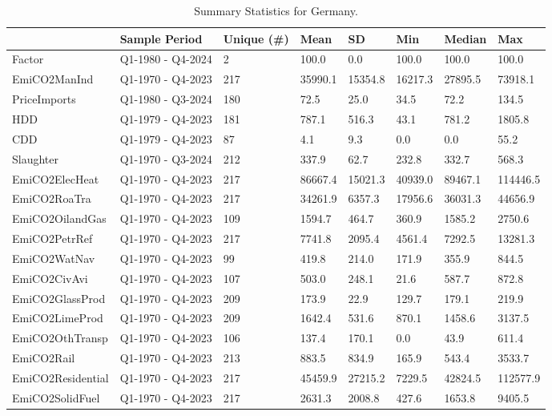 \begingroup\fontsize{7}{9}\selectfont

\begin{longtable}[t]{llllllll}
\caption{Summary Statistics for Germany.}\\
\toprule
  & Sample Period & Unique (\#) & Mean & SD & Min & Median & Max\\
\midrule
Factor & Q1-1980 - Q4-2024 & 2 & 100.0 & 0.0 & 100.0 & 100.0 & 100.0\\
EmiCO2ManInd & Q1-1970 - Q4-2023 & 217 & 35990.1 & 15354.8 & 16217.3 & 27895.5 & 73918.1\\
PriceImports & Q1-1980 - Q3-2024 & 180 & 72.5 & 25.0 & 34.5 & 72.2 & 134.5\\
HDD & Q1-1979 - Q4-2023 & 181 & 787.1 & 516.3 & 43.1 & 781.2 & 1805.8\\
CDD & Q1-1979 - Q4-2023 & 87 & 4.1 & 9.3 & 0.0 & 0.0 & 55.2\\
\addlinespace
Slaughter & Q1-1970 - Q3-2024 & 212 & 337.9 & 62.7 & 232.8 & 332.7 & 568.3\\
EmiCO2ElecHeat & Q1-1970 - Q4-2023 & 217 & 86667.4 & 15021.3 & 40939.0 & 89467.1 & 114446.5\\
EmiCO2RoaTra & Q1-1970 - Q4-2023 & 217 & 34261.9 & 6357.3 & 17956.6 & 36031.3 & 44656.9\\
EmiCO2OilandGas & Q1-1970 - Q4-2023 & 109 & 1594.7 & 464.7 & 360.9 & 1585.2 & 2750.6\\
EmiCO2PetrRef & Q1-1970 - Q4-2023 & 217 & 7741.8 & 2095.4 & 4561.4 & 7292.5 & 13281.3\\
\addlinespace
EmiCO2WatNav & Q1-1970 - Q4-2023 & 99 & 419.8 & 214.0 & 171.9 & 355.9 & 844.5\\
EmiCO2CivAvi & Q1-1970 - Q4-2023 & 107 & 503.0 & 248.1 & 21.6 & 587.7 & 872.8\\
EmiCO2GlassProd & Q1-1970 - Q4-2023 & 209 & 173.9 & 22.9 & 129.7 & 179.1 & 219.9\\
EmiCO2LimeProd & Q1-1970 - Q4-2023 & 209 & 1642.4 & 531.6 & 870.1 & 1458.6 & 3137.5\\
EmiCO2OthTransp & Q1-1970 - Q4-2023 & 106 & 137.4 & 170.1 & 0.0 & 43.9 & 611.4\\
\addlinespace
EmiCO2Rail & Q1-1970 - Q4-2023 & 213 & 883.5 & 834.9 & 165.9 & 543.4 & 3533.7\\
EmiCO2Residential & Q1-1970 - Q4-2023 & 217 & 45459.9 & 27215.2 & 7229.5 & 42824.5 & 112577.9\\
EmiCO2SolidFuel & Q1-1970 - Q4-2023 & 217 & 2631.3 & 2008.8 & 427.6 & 1653.8 & 9405.5\\

\end{longtable}
